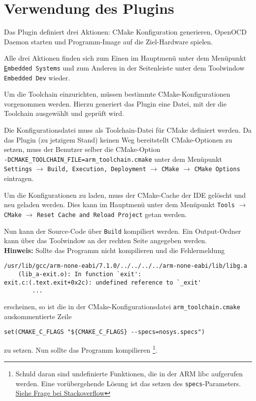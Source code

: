 \section{Verwendung des Plugins}
Das Plugin definiert drei Aktionen: CMake Konfiguration generieren, OpenOCD Daemon starten und Programm-Image auf die
Ziel-Hardware spielen.

Alle drei Aktionen finden sich zum Einen im Hauptmenü unter dem Menüpunkt \texttt{\underline{E}mbedded Systems} und zum
Anderen in der Seitenleiste unter dem Toolwindow \texttt{Embedded Dev} wieder.

    Um die Toolchain einzurichten, müssen bestimmte CMake-Konfigurationen vorgenommen werden. Hierzu generiert das
    Plugin eine Datei, mit der die Toolchain ausgewählt und geprüft wird.

    Die Konfigurationsdatei muss als Toolchain-Datei für CMake definiert werden. Da das Plugin (zu jetzigem Stand)
    keinen Weg bereitstellt CMake-Optionen zu setzen, muss der Benutzer selber die CMake-Option \\
    \texttt{-DCMAKE\_TOOLCHAIN\_FILE=arm\_toolchain.cmake} unter dem Menüpunkt \\
    \texttt{Settings} $\rightarrow$
    \texttt{Build, Execution, Deployment} $\rightarrow$ \texttt{CMake} $\rightarrow$ \texttt{CMake Options} eintragen.

    Um die Konfigurationen zu laden, muss der CMake-Cache der IDE gelöscht und neu geladen werden. Dies kann im
    Hauptmenü unter dem Menüpunkt \texttt{Tools} $\rightarrow$ \texttt{CMake} $\rightarrow$
    \texttt{Reset Cache and Reload Project} getan werden.

    Nun kann der Source-Code über \texttt{Build} kompiliert werden. Ein Output-Ordner kann über das Toolwindow an der
    rechten Seite angegeben werden.\\
    \textbf{Hinweis:} Sollte das Programm nicht kompilieren und die Fehlermeldung
    \begin{Verbatim}
/usr/lib/gcc/arm-none-eabi/7.1.0/../../../../arm-none-eabi/lib/libg.a
    (lib_a-exit.o): In function `exit':
exit.c:(.text.exit+0x2c): undefined reference to `_exit'
        ...
    \end{Verbatim}
    erscheinen, so ist die in der CMake-Konfigurationsdatei \texttt{arm\_toolchain.cmake} auskommentierte Zeile
    \begin{Verbatim}
set(CMAKE_C_FLAGS "${CMAKE_C_FLAGS} --specs=nosys.specs")
    \end{Verbatim}
    zu setzen. Nun sollte das Programm kompilieren
    \footnote{Schuld daran sind undefinierte Funktionen, die in der ARM libc aufgerufen werden.
    Eine vorübergehende Lösung ist das setzen des \texttt{specs}-Parameters.
    \href{https://stackoverflow.com/a/23922211/6755839}{Siehe Frage bei Stackoverflow}}.

